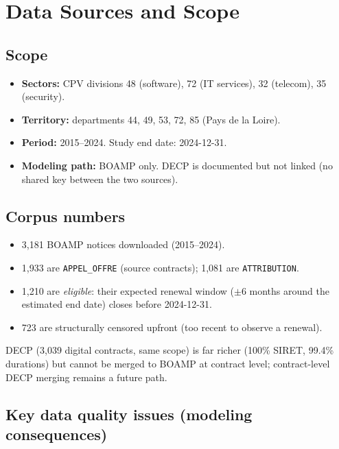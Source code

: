 \documentclass[11pt,a4paper]{article}
\begin{document}
\section{Data Sources and Scope}
\label{sec:data}

\subsection{Scope}
\begin{itemize}[leftmargin=1.4em,itemsep=1pt]
  \item \textbf{Sectors:} CPV divisions 48 (software), 72 (IT services), 32 (telecom), 35 (security).
  \item \textbf{Territory:} departments 44, 49, 53, 72, 85 (Pays de la Loire).
  \item \textbf{Period:} 2015--2024. Study end date: 2024-12-31.
  \item \textbf{Modeling path:} BOAMP only. DECP is documented but not linked
        (no shared key between the two sources).
\end{itemize}

\subsection{Corpus numbers}
\begin{itemize}[leftmargin=1.4em,itemsep=1pt]
  \item 3{,}181 BOAMP notices downloaded (2015--2024).
  \item 1{,}933 are \texttt{APPEL\_OFFRE} (source contracts); 1{,}081 are \texttt{ATTRIBUTION}.
  \item 1{,}210 are \emph{eligible}: their expected renewal window ($\pm 6$ months around the estimated end date) closes before 2024-12-31.
  \item 723 are structurally censored upfront (too recent to observe a renewal).
\end{itemize}

DECP (3{,}039 digital contracts, same scope) is far richer (100\% SIRET, 99.4\%
durations) but cannot be merged to BOAMP at contract level; contract-level DECP
merging remains a future path.

\subsection{Key data quality issues (modeling consequences)}
\end{document}

